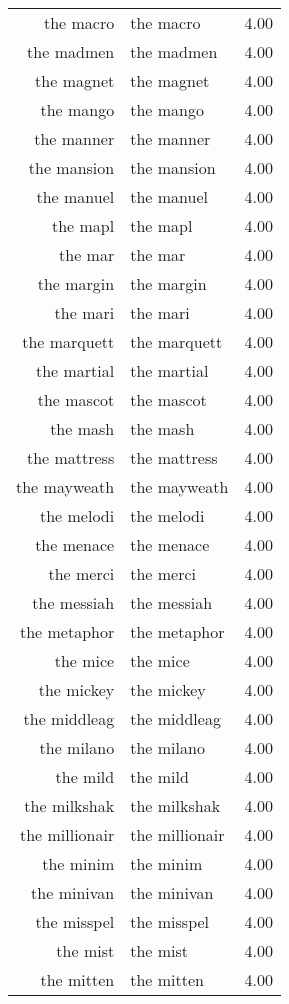 \begin{table}[ht]
\begin{tabular}{rlr}
  the macro & the macro & 4.00 \\ 
  the madmen & the madmen & 4.00 \\ 
  the magnet & the magnet & 4.00 \\ 
  the mango & the mango & 4.00 \\ 
  the manner & the manner & 4.00 \\ 
  the mansion & the mansion & 4.00 \\ 
  the manuel & the manuel & 4.00 \\ 
  the mapl & the mapl & 4.00 \\ 
  the mar & the mar & 4.00 \\ 
  the margin & the margin & 4.00 \\ 
  the mari & the mari & 4.00 \\ 
  the marquett & the marquett & 4.00 \\ 
  the martial & the martial & 4.00 \\ 
  the mascot & the mascot & 4.00 \\ 
  the mash & the mash & 4.00 \\ 
  the mattress & the mattress & 4.00 \\ 
  the mayweath & the mayweath & 4.00 \\ 
  the melodi & the melodi & 4.00 \\ 
  the menace & the menace & 4.00 \\ 
  the merci & the merci & 4.00 \\ 
  the messiah & the messiah & 4.00 \\ 
  the metaphor & the metaphor & 4.00 \\ 
  the mice & the mice & 4.00 \\ 
  the mickey & the mickey & 4.00 \\ 
  the middleag & the middleag & 4.00 \\ 
  the milano & the milano & 4.00 \\ 
  the mild & the mild & 4.00 \\ 
  the milkshak & the milkshak & 4.00 \\ 
  the millionair & the millionair & 4.00 \\ 
  the minim & the minim & 4.00 \\ 
  the minivan & the minivan & 4.00 \\ 
  the misspel & the misspel & 4.00 \\ 
  the mist & the mist & 4.00 \\ 
  the mitten & the mitten & 4.00 \\ 

\end{tabular}
\end{table}
